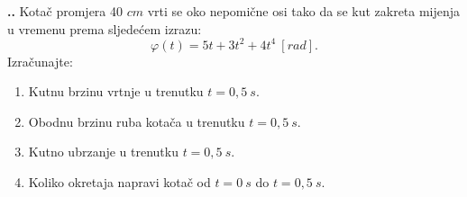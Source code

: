 

\noindent 
\textbf{
\thecjelina.\thezadatak.}
Kotač promjera 40 $cm$ vrti se oko nepomične osi tako da se kut zakreta mijenja u vremenu prema sljedećem izrazu:
$$
\varphi(t)=5t+3t^2+4t^4\ [rad].
$$
Izračunajte:
\begin{enumerate}[label=\alph*)]
 \item Kutnu brzinu vrtnje u trenutku $t=0,5\ s$.
 \item Obodnu brzinu ruba kotača u trenutku $t=0,5\ s$.
 \item Kutno ubrzanje u trenutku $t=0,5\ s$.
 \item Koliko okretaja napravi kotač od $t=0\ s$ do $t=0,5\ s$.
\end{enumerate}
